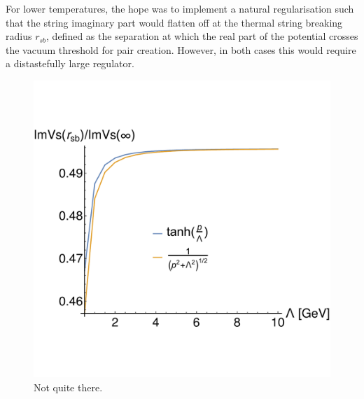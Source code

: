 \documentclass[12pt,a4paper]{article}
\begin{document}
\clearpage
For lower temperatures, the hope was to implement a natural regularisation such that the string imaginary part would flatten off at the thermal string breaking radius \(r_{sb}\), defined as the separation at which the real part of the potential crosses the vacuum threshold for pair creation. However, in both cases this would require a distastefully large regulator.
\begin{figure}[H]
	\centering
	\includegraphics[width=\textwidth]{ratio} 
	\caption{Not quite there.}
	\label{fig:ratio}
\end{figure}
\end{document}
